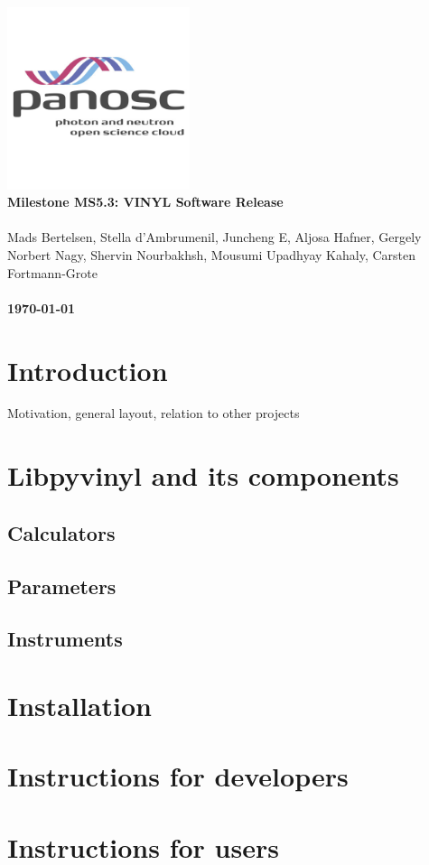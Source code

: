\documentclass[10pt]{scrartcl}
\begin{document}
\makeatletter
\begin{titlepage}
\thispagestyle{scrheadings}
\ohead{}
\ihead{}
\chead{}
\ifoot{}
\ofoot{}
\noindent%
\includegraphics[width=0.4\textwidth]{figures/PaNOSClogo_web_RGB_512x512.jpg}\\
\Huge{%
\renewcommand{\baselinestretch}{2.0}%
  \textbf{%
    Milestone MS5.3: VINYL Software Release\\
  }%
}%
\\
{%
\Large{%
  Mads Bertelsen,
  Stella d'Ambrumenil,
  Juncheng E,
  Aljosa Hafner,
  Gergely Norbert Nagy,
  Shervin Nourbakhsh,
  Mousumi Upadhyay Kahaly,
  Carsten Fortmann-Grote
  \bigskip\\
  \bigskip\\
  \textbf{\today}%
}}%
\end{titlepage}
\makeatother

\section{Introduction}
Motivation, general layout, relation to other projects

\section{Libpyvinyl and its components}
\label{sec:libpyvinyl}

\subsection{Calculators}
\label{sec:calculators}

\subsection{Parameters}
\label{sec:parameters}

\subsection{Instruments}
\label{sec:instruments}

\section{Installation}
\label{sec:installation}

\section{Instructions for developers}
\label{sec:dev}

\section{Instructions for users}
\label{sec:users}
\end{document}
